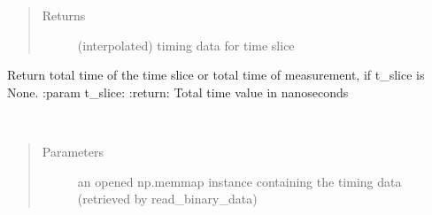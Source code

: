 \documentclass[letterpaper,10pt,english]{sphinxmanual}
\begin{document}
\begin{fulllineitems}
\begin{fulllineitems}
\begin{quote}
\begin{description}
\item[{Returns}] \leavevmode
\sphinxAtStartPar
(interpolated) timing data for time slice

\end{description}\end{quote}

\end{fulllineitems}


\begin{fulllineitems}
\label{\detokenize{autodocs/data:listmode.data.TimeCache.get_total_time}}
\sphinxAtStartPar
Return total time of the time slice or total time of measurement, if t\_slice is None.
:param t\_slice:
:return: Total time value in nanoseconds

\end{fulllineitems}


\begin{fulllineitems}
\label{\detokenize{autodocs/data:listmode.data.TimeCache.set}}~\begin{quote}\begin{description}
\item[{Parameters}] \leavevmode
\sphinxAtStartPar
{} \textendash{} an opened np.memmap instance containing the timing data (retrieved by read\_binary\_data)

\end{description}\end{quote}

\end{fulllineitems}


\end{fulllineitems}

\end{document}
